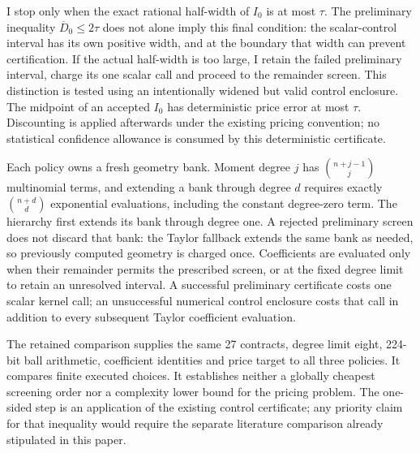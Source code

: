 I stop only when the exact rational half-width of $I_0$ is at most $\tau$.
The preliminary inequality $\overline D_0\leq2\tau$ does not alone imply
this final condition: the scalar-control interval has its own positive
width, and at the boundary that width can prevent certification. If the
actual half-width is too large, I retain the failed preliminary interval,
charge its one scalar call and proceed to the remainder screen. This
distinction is tested using an intentionally widened but valid control
enclosure. The midpoint of an accepted $I_0$ has deterministic price error
at most $\tau$. Discounting is applied afterwards under the existing
pricing convention; no statistical confidence allowance is consumed by
this deterministic certificate.

Each policy owns a fresh geometry bank. Moment degree $j$ has
$\binom{n+j-1}{j}$ multinomial terms, and extending a bank through degree
$d$ requires exactly $\binom{n+d}{d}$ exponential evaluations, including
the constant degree-zero term. The hierarchy first extends its bank through
degree one. A rejected preliminary screen does not discard that bank: the
Taylor fallback extends the same bank as needed, so previously computed
geometry is charged once. Coefficients are evaluated only when their
remainder permits the prescribed screen, or at the fixed degree limit to
retain an unresolved interval. A successful preliminary certificate costs
one scalar kernel call; an unsuccessful numerical control enclosure costs
that call in addition to every subsequent Taylor coefficient evaluation.

The retained comparison supplies the same 27 contracts, degree limit eight,
224-bit ball arithmetic, coefficient identities and price target to all
three policies. It compares finite executed choices. It establishes neither
a globally cheapest screening order nor a complexity lower bound for the
pricing problem. The one-sided step is an application of the existing
control certificate; any priority claim for that inequality would require
the separate literature comparison already stipulated in this paper.
